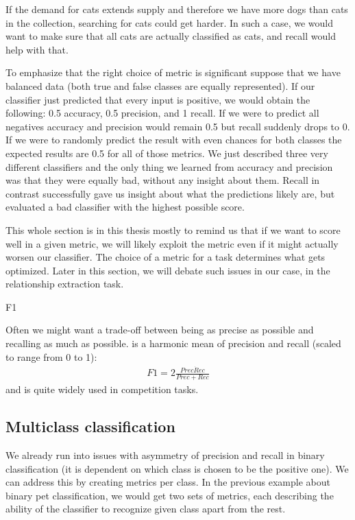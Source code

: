 If the demand for cats extends supply and therefore we have more dogs than cats in the collection, searching for cats could get harder. In such a case, we would want to make sure that all cats are actually classified as cats, and recall would help with that.


To emphasize that the right choice of metric is significant suppose that we have balanced data (both true and false classes are equally represented). If our classifier just predicted that every input is positive, we would obtain the following: 0.5 accuracy, 0.5 precision, and 1 recall. If we were to predict all negatives accuracy and precision would remain 0.5 but recall suddenly drops to 0. If we were to randomly predict the result with even chances for both classes the expected results are 0.5 for all of those metrics. We just described three very different classifiers and the only thing we learned from accuracy and precision was that they were equally bad, without any insight about them. Recall in contrast successfully gave us insight about what the predictions likely are, but evaluated a bad classifier with the highest possible score.   

This whole section is in this thesis mostly to remind us that if we want to score well in a given metric, we will likely exploit the metric even if it might actually worsen our classifier. The choice of a metric for a task determines what gets optimized. Later in this section, we will debate such issues in our case, in the relationship extraction task.




F1

Often we might want a trade-off between being as precise as possible and recalling as much as possible.  is a harmonic mean of precision and recall (scaled to range from 0 to 1): \begin{align}
F1 = 2\frac{Prec \dot Rec}{Prec + Rec}
\end{align}and is quite widely used in competition tasks.

\subsection{Multiclass classification}


We already run into issues with asymmetry of precision and recall in binary classification (it is dependent on which class is chosen to be the positive one). We can address this by creating metrics per class. In the previous example about binary pet classification, we would get two sets of metrics, each describing the ability of the classifier to recognize given class apart from the rest.

